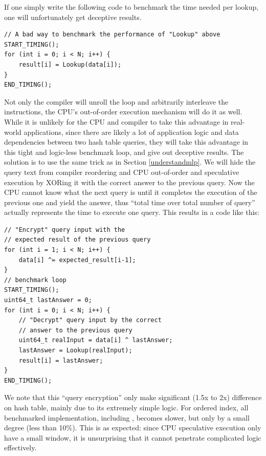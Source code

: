 \documentclass[11pt, usletter]{article}
\begin{document}
If one simply write the following code to benchmark the time needed per lookup, 
one will unfortunately get deceptive results.

\singlespacing\begin{codebox}
\begin{verbatim}
// A bad way to benchmark the performance of "Lookup" above
START_TIMING();
for (int i = 0; i < N; i++) { 
    result[i] = Lookup(data[i]);
}
END_TIMING();
\end{verbatim}
\end{codebox}\doublespacing

Not only the compiler will unroll the loop and arbitrarily interleave the instructions, 
the CPU's out-of-order execution mechanism will do it as well. 
While it is unlikely for the CPU and compiler to take this advantage in real-world applications, 
since there are likely a lot of application logic and data dependencies between two hash table queries, 
they will take this advantage in this tight and logic-less benchmark loop, and give out deceptive results. 
The solution is to use the same trick as in Section \ref{understandmlp}. 
We will hide the query text from compiler reordering and CPU out-of-order and speculative execution by 
XORing it with the correct answer to the previous query. 
Now the CPU cannot know what the next query is until it completes the execution of the previous one and yield the answer, 
thus ``total time over total number of query'' actually represents the time to execute one query. 
This results in a code like this:

\singlespacing\begin{codebox}
\begin{verbatim}
// "Encrypt" query input with the 
// expected result of the previous query
for (int i = 1; i < N; i++) {
    data[i] ^= expected_result[i-1];
}
// benchmark loop
START_TIMING();
uint64_t lastAnswer = 0;
for (int i = 0; i < N; i++) { 
    // "Decrypt" query input by the correct 
    // answer to the previous query 
    uint64_t realInput = data[i] ^ lastAnswer;
    lastAnswer = Lookup(realInput);
    result[i] = lastAnswer;
}
END_TIMING();
\end{verbatim}
\end{codebox}\doublespacing

We note that this ``query encryption'' only make significant (1.5x to 2x) difference on hash table, mainly due to its extremely simple logic. 
For ordered index, all benchmarked implementation, including \MlpIndex, becomes slower, but only by a small degree (less than 10\%). 
This is as expected: since CPU speculative execution only have a small window, it is unsurprising that it 
cannot penetrate complicated logic effectively. 
\end{document}
